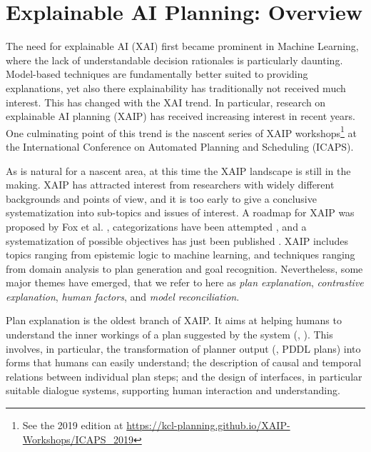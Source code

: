 \section{Explainable AI Planning: Overview}
\label{xaip}

The need for explainable AI (XAI) first became prominent in Machine
Learning, where the lack of understandable decision rationales is
particularly daunting. Model-based techniques are fundamentally better
suited to providing explanations, yet also there explainability has
traditionally not received much interest. This has changed with the
XAI trend. In particular, research on explainable AI planning (XAIP)
has received increasing interest in recent years. One culminating
point of this trend is the nascent series of XAIP
workshops\footnote{See the 2019 edition at
  \url{https://kcl-planning.github.io/XAIP-Workshops/ICAPS_2019}} at
the International Conference on Automated Planning and Scheduling
(ICAPS).

As is natural for a nascent area, at this time the XAIP landscape is
still in the making. XAIP has attracted interest from researchers with
widely different backgrounds and points of view, and it is too early
to give a conclusive systematization into sub-topics and issues of
interest. A roadmap for XAIP was proposed by Fox et
al. \cite{fox:etal:ijcai-ws-17}, categorizations have been attempted
\cite{langley:etal:aaai-17}, and a systematization of possible
objectives has just been published \cite{chakraborti:icaps-19}. XAIP
includes topics ranging from epistemic logic to machine learning, and
techniques ranging from domain analysis to plan generation and goal
recognition. Nevertheless, some major themes have emerged, that we
refer to here as \emph{plan explanation}, \emph{contrastive
  explanation}, \emph{human factors}, and \emph{model reconciliation}.

Plan explanation is the oldest branch of XAIP. It aims at helping
humans to understand the inner workings of a plan suggested by the
system (\eg,
\cite{mcguiness:etal:flairs-07,khan:etal:icaps-09,bidot:etal:mkwi-10,sohrabi:etal:aaai-11,seegebarth:etal:icaps-12,bercher:etal:icaps-14,nothdurft:etal:sigdal-15}). This
involves, in particular, the transformation of planner output (\eg,
PDDL plans) into forms that humans can easily understand; the
description of causal and temporal relations between individual plan
steps; and the design of interfaces, in particular suitable dialogue
systems, supporting human interaction and understanding.

